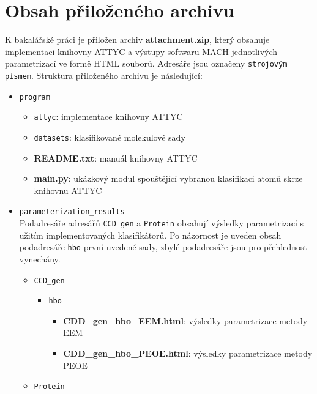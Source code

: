 \chapter{Obsah přiloženého archivu}
\label{prilozeny_archiv}
K bakalářské práci je přiložen archiv \textbf{attachment.zip}, který obsahuje implementaci kni\-hovny ATTYC a výstupy softwaru MACH jednotlivých parametrizací ve formě HTML souborů. Adresáře  jsou označeny \verb|strojovým písmem|. Struktura přiloženého archivu je následující: 
\begin{itemize}
    \item \verb|program| 
    \begin{itemize}
        \item \verb|attyc|: implementace knihovny ATTYC
        \item \verb|datasets|: klasifikované molekulové sady 
        \item \textbf{README.txt}: manuál knihovny ATTYC
        \item\textbf{main.py}: ukázkový modul spouštějící vybranou klasifikaci atomů skrze knihovnu ATTYC
    \end{itemize}
    \item \verb|parameterization_results| \\
    Podadresáře adresářů \verb|CCD_gen| a \verb|Protein| obsahují výsledky parametrizací s uži\-tím implementovaných  klasifikátorů. Po názornost je uveden obsah podadresáře \verb|hbo| první uvedené sady, zbylé podadresáře jsou pro přehlednost vynechány.
    \begin{itemize}
        \item \verb|CCD_gen|
        \begin{itemize}
            \item \verb|hbo|
            \begin{itemize}
                \item \textbf{CDD\_gen\_hbo\_EEM.html}: výsledky parametrizace metody EEM
                \item \textbf{CDD\_gen\_hbo\_PEOE.html}: výsledky parametrizace metody PEOE
            \end{itemize}
        \end{itemize}
        \item \verb|Protein|
    \end{itemize}
\end{itemize}

